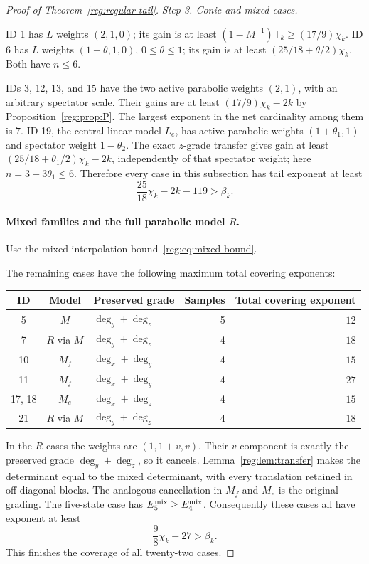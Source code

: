\documentclass[11pt]{amsart}
\theoremstyle{definition}
\theoremstyle{remark}
\numberwithin{equation}{section}
\begin{document}
\begin{proof}[Proof of Theorem~\ref{reg:regular-tail}]
\par\medskip\noindent\textit{Step 3. Conic and mixed cases.}\par\nobreak\smallskip
ID 1 has $L$ weights $(2,1,0)$; its gain is at least $(1-M^{-1})\mathsf T_k\ge(17/9)\chi_k$. ID 6 has $L$ weights $(1+\theta,1,0)$, $0\le\theta\le1$; its gain is at least $(25/18+\theta/2)\chi_k$. Both have $n\le6$.

IDs 3, 12, 13, and 15 have the two active parabolic weights $(2,1)$, with an arbitrary spectator scale. Their gains are at least $(17/9)\chi_k-2k$ by Proposition~\ref{reg:prop:P}. The largest exponent in the net cardinality among them is $7$. ID 19, the central-linear model $L_e$, has active parabolic weights $(1+\theta_1,1)$ and spectator weight $1-\theta_2$. The exact $z$-grade transfer gives gain at least $(25/18+\theta_1/2)\chi_k-2k$, independently of that spectator weight; here $n=3+3\theta_1\le6$. Therefore every case in this subsection has tail exponent at least
\begin{equation}\label{reg:eq:conic-tail}
 \frac{25}{18}\chi_k-2k-119>\beta_k.
\end{equation}

\paragraph{Mixed families and the full parabolic model $R$.}
Use the mixed interpolation bound~\eqref{reg:eq:mixed-bound}.

The remaining cases have the following maximum total covering exponents:
\begin{center}\small
\begin{tabular}{cclrr}
\toprule
ID & Model & Preserved grade & Samples & Total covering exponent\\\midrule
5 & $M$ & $\deg_y+\deg_z$ & 5 & $12$\\
7 & $R$ via $M$ & $\deg_y+\deg_z$ & 4 & $18$\\
10 & $M_f$ & $\deg_x+\deg_y$ & 4 & $15$\\
11 & $M_f$ & $\deg_x+\deg_y$ & 4 & $27$\\
17, 18 & $M_e$ & $\deg_x+\deg_z$ & 4 & $15$\\
21 & $R$ via $M$ & $\deg_y+\deg_z$ & 4 & $18$\\\bottomrule
\end{tabular}
\end{center}
In the $R$ cases the weights are $(1,1+v,v)$. Their $v$ component is exactly the preserved grade $\deg_y+\deg_z$, so it cancels. Lemma~\ref{reg:lem:transfer} makes the determinant equal to the mixed determinant, with every translation retained in off-diagonal blocks. The analogous cancellation in $M_f$ and $M_e$ is the original grading. The five-state case has $E_5^{\rm mix}\ge E_4^{\rm mix}$. Consequently these cases all have exponent at least
\begin{equation}\label{reg:eq:mixed-tail}
 \frac98\chi_k-27>\beta_k.
\end{equation}
This finishes the coverage of all twenty-two cases.


\end{proof}
\end{document}
